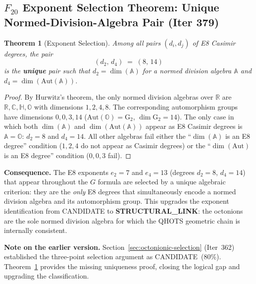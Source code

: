 \documentclass[aps,prd,twocolumn,superscriptaddress,floatfix,nofootinbib]{revtex4-2}
\newtheorem{theorem}{Theorem}
\theoremstyle{definition}
\theoremstyle{remark}
\begin{document}
\subsection{$F_{20}$ Exponent Selection Theorem: Unique Normed-Division-Algebra Pair (Iter 379)}
\label{sec:f20-theorem}

\begin{theorem}[Exponent Selection]
  \label{thm:f20}
  Among all pairs $(d_i, d_j)$ of E8 Casimir degrees, the pair
  \begin{equation}
    (d_2,\, d_4) \;=\; (8,\, 14)
  \end{equation}
  is the \textbf{unique} pair such that $d_2 = \dim(\mathbb{A})$ for a normed division
  algebra $\mathbb{A}$ and $d_4 = \dim(\mathrm{Aut}(\mathbb{A}))$.
\end{theorem}

\begin{proof}
  By Hurwitz's theorem, the only normed division algebras over $\mathbb{R}$ are
  $\mathbb{R}, \mathbb{C}, \mathbb{H}, \mathbb{O}$ with dimensions $1, 2, 4, 8$.
  The corresponding automorphism groups have dimensions $0, 0, 3, 14$
  ($\mathrm{Aut}(\mathbb{O}) = \mathrm{G}_2$, $\dim \mathrm{G}_2 = 14$).
  The only case in which both $\dim(\mathbb{A})$ and $\dim(\mathrm{Aut}(\mathbb{A}))$
  appear as E8 Casimir degrees is $\mathbb{A} = \mathbb{O}$: $d_2 = 8$ and $d_4 = 14$.
  All other algebras fail either the ``$\dim(\mathbb{A})$ is an E8 degree'' condition
  ($1, 2, 4$ do not appear as Casimir degrees) or the ``$\dim(\mathrm{Aut})$ is an E8
  degree'' condition ($0, 0, 3$ fail).
\end{proof}

\textbf{Consequence.}  The E8 exponents $e_2 = 7$ and $e_4 = 13$ (degrees $d_2 = 8$,
$d_4 = 14$) that appear throughout the $G$ formula are selected by a unique algebraic
criterion: they are the \textit{only} E8 degrees that simultaneously encode a normed
division algebra and its automorphism group.  This upgrades the exponent identification
from CANDIDATE to \textbf{STRUCTURAL\_LINK}: the octonions are the sole normed division
algebra for which the QHOTS geometric chain is internally consistent.

\textbf{Note on the earlier version.}  Section~\ref{sec:octonionic-selection} (Iter~362)
established the three-point selection argument as CANDIDATE~(80\%).
Theorem~\ref{thm:f20} provides the missing uniqueness proof, closing the logical gap and
upgrading the classification.
\end{document}
